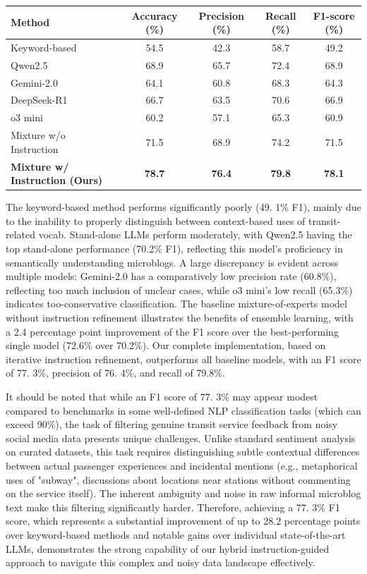 \documentclass[a4paper,fleqn,12pt]{cas-sc}
\begin{document}
\begin{center}
\label{tab:filtering_performance}
\begin{tabular}{lcccc}
\toprule
Method & Accuracy (\%) & Precision (\%) & Recall (\%) & F1-score (\%) \\
\midrule
Keyword-based & 54.5 & 42.3 & 58.7 & 49.2 \\
Qwen2.5 & 68.9 & 65.7 & 72.4 & 68.9 \\
Gemini-2.0 & 64.1 & 60.8 & 68.3 & 64.3 \\
DeepSeek-R1 & 66.7 & 63.5 & 70.6 & 66.9 \\
o3 mini & 60.2 & 57.1 & 65.3 & 60.9 \\
Mixture w/o Instruction & 71.5 & 68.9 & 74.2 & 71.5 \\
\textbf{Mixture w/ Instruction (Ours)} & \textbf{78.7} & \textbf{76.4} & \textbf{79.8} & \textbf{78.1} \\
\bottomrule
\end{tabular}
\end{center}

The keyword-based method performs significantly poorly (49. 1\% F1), mainly due to the inability to properly distinguish between context-based uses of transit-related vocab. Stand-alone LLMs perform moderately, with Qwen2.5 having the top stand-alone performance (70.2\% F1), reflecting this model's proficiency in semantically understanding microblogs. A large discrepancy is evident across multiple models: Gemini-2.0 has a comparatively low precision rate (60.8\%), reflecting too much inclusion of unclear cases, while o3 mini's low recall (65.3\%) indicates too-conservative classification. The baseline mixture-of-experts model without instruction refinement illustrates the benefits of ensemble learning, with a 2.4 percentage point improvement of the F1 score over the best-performing single model (72.6\% over 70.2\%). Our complete implementation, based on iterative instruction refinement, outperforms all baseline models, with an F1 score of 77. 3\%, precision of 76. 4\%, and recall of 79.8\%. 

It should be noted that while an F1 score of 77. 3\% may appear modest compared to benchmarks in some well-defined NLP classification tasks (which can exceed 90\%), the task of filtering genuine transit service feedback from noisy social media data presents unique challenges. Unlike standard sentiment analysis on curated datasets, this task requires distinguishing subtle contextual differences between actual passenger experiences and incidental mentions (e.g., metaphorical uses of "subway", discussions about locations near stations without commenting on the service itself). The inherent ambiguity and noise in raw informal microblog text make this filtering significantly harder. Therefore, achieving a 77. 3\% F1 score, which represents a substantial improvement of up to 28.2 percentage points over keyword-based methods and notable gains over individual state-of-the-art LLMs, demonstrates the strong capability of our hybrid instruction-guided approach to navigate this complex and noisy data landscape effectively.
\end{document}

